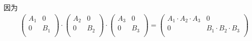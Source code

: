 因为
\begin{equation}
\begin{split}
&\begin{pmatrix}A_1 & 0 \\ 0 & B_1 \\ \end{pmatrix}\cdot \begin{pmatrix}A_2 & 0 \\ 0 & B_2 \\ \end{pmatrix}\cdot \begin{pmatrix}A_3 & 0 \\ 0 & B_3 \\ \end{pmatrix}= \begin{pmatrix}A_1\cdot A_2\cdot A_3 & 0 \\ 0 & B_1\cdot B_2 \cdot B_3\\ \end{pmatrix}
\end{split}
\end{equation}

